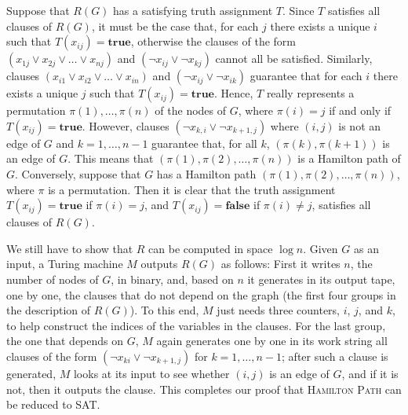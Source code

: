 \documentclass[12pt]{article}
\begin{document}
Suppose that $R(G)$ has a satisfying truth assignment $T$. Since $T$ satisfies all clauses of $R(G)$, it must be the case that, for each $j$ there exists a unique $i$ such that $T(x_{ij}) = \mathbf{true}$, otherwise the clauses of the form $(x_{1j} \vee x_{2j} \vee \ldots \vee x_{nj})$ and $(\neg x_{ij} \vee \neg x_{kj})$ cannot all be satisfied. Similarly, clauses $(x_{i1} \vee x_{i2} \vee \ldots \vee x_{in})$ and $(\neg x_{ij} \vee \neg x_{ik})$ guarantee that for each $i$ there exists a unique $j$ such that $T(x_{ij}) = \mathbf{true}$. Hence, $T$ really represents a permutation $\pi(1), \ldots, \pi(n)$ of the nodes of $G$, where $\pi(i) = j$ if and only if $T(x_{ij}) = \mathbf{true}$. However, clauses $(\neg x_{k,i} \vee \neg x_{k+1,j})$ where $(i,j)$ is not an edge of $G$ and $k = 1, \ldots, n-1$ guarantee that, for all $k$, $(\pi(k), \pi(k+1))$ is an edge of $G$. This means that $(\pi(1), \pi(2), \ldots, \pi(n))$ is a Hamilton path of $G$. Conversely, suppose that $G$ has a Hamilton path $(\pi(1), \pi(2), \ldots, \pi(n))$, where $\pi$ is a permutation. Then it is clear that the truth assignment $T(x_{ij}) = \mathbf{true}$ if $\pi(i) = j$, and $T(x_{ij}) = \mathbf{false}$ if $\pi(i) \neq j$, satisfies all clauses of $R(G)$.

We still have to show that $R$ can be computed in space $\log n$. Given $G$ as an input, a Turing machine $M$ outputs $R(G)$ as follows: First it writes $n$, the number of nodes of $G$, in binary, and, based on $n$ it generates in its output tape, one by one, the clauses that do not depend on the graph (the first four groups in the description of $R(G)$). To this end, $M$ just needs three counters, $i$, $j$, and $k$, to help construct the indices of the variables in the clauses. For the last group, the one that depends on $G$, $M$ again generates one by one in its work string all clauses of the form $(\neg x_{ki} \vee \neg x_{k+1,j})$ for $k = 1, \ldots, n-1$; after such a clause is generated, $M$ looks at its input to see whether $(i, j)$ is an edge of $G$, and if it is not, then it outputs the clause. This completes our proof that \textsc{Hamilton Path} can be reduced to \textsc{SAT}.
\end{document}
